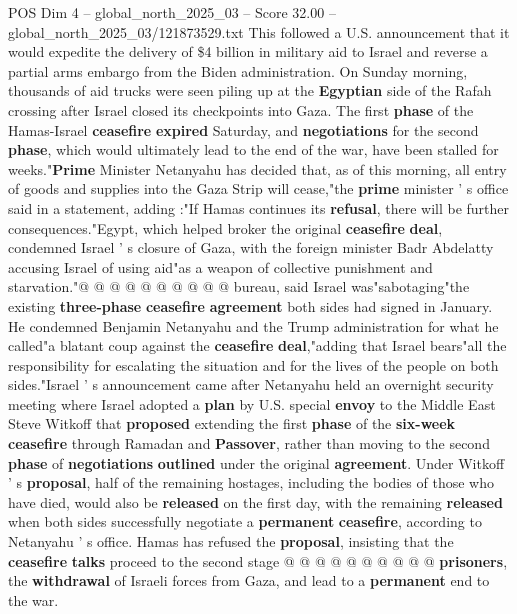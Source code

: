 \begin{textsample}{POS Dim 4 – global\_north\_2025\_03 – Score 32.00 – global\_north\_2025\_03/121873529.txt}  \label{ex:f4_pos_064}
This followed a U.S. announcement that it would expedite the delivery of \$4 billion in military aid to Israel and reverse a partial arms embargo from the Biden administration.
On Sunday morning, thousands of aid trucks were seen piling up at the \textbf{Egyptian} side of the Rafah crossing after Israel closed its checkpoints into Gaza.
The first \textbf{phase} of the Hamas-Israel \textbf{ceasefire} \textbf{expired} Saturday, and \textbf{negotiations} for the second \textbf{phase}, which would ultimately lead to the end of the war, have been stalled for weeks."\textbf{Prime} Minister Netanyahu has decided that, as of this morning, all entry of goods and supplies into the Gaza Strip will cease,"the \textbf{prime} minister ' s office said in a statement, adding :"If Hamas continues its \textbf{refusal}, there will be further consequences."Egypt, which helped broker the original \textbf{ceasefire} \textbf{deal}, condemned Israel ' s closure of Gaza, with the foreign minister Badr Abdelatty accusing Israel of using aid"as a weapon of collective punishment and starvation."@ @ @ @ @ @ @ @ @ @ bureau, said Israel was"sabotaging"the existing \textbf{three-phase} \textbf{ceasefire} \textbf{agreement} both sides had signed in January.
He condemned Benjamin Netanyahu and the Trump administration for what he called"a blatant coup against the \textbf{ceasefire} \textbf{deal},"adding that Israel bears"all the responsibility for escalating the situation and for the lives of the people on both sides."Israel ' s announcement came after Netanyahu held an overnight security meeting where Israel adopted a \textbf{plan} by U.S. special \textbf{envoy} to the Middle East Steve Witkoff that \textbf{proposed} extending the first \textbf{phase} of the \textbf{six-week} \textbf{ceasefire} through Ramadan and \textbf{Passover}, rather than moving to the second \textbf{phase} of \textbf{negotiations} \textbf{outlined} under the original \textbf{agreement}.
Under Witkoff ' s \textbf{proposal}, half of the remaining hostages, including the bodies of those who have died, would also be \textbf{released} on the first day, with the remaining \textbf{released} when both sides successfully negotiate a \textbf{permanent} \textbf{ceasefire}, according to Netanyahu ' s office.
Hamas has refused the \textbf{proposal}, insisting that the \textbf{ceasefire} \textbf{talks} proceed to the second stage @ @ @ @ @ @ @ @ @ @ \textbf{prisoners}, the \textbf{withdrawal} of Israeli forces from Gaza, and lead to a \textbf{permanent} end to the war.

\end{textsample}
